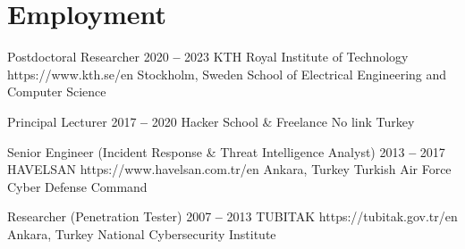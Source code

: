 

\section{Employment}

  
    \itemizeCVBegin[nolabel]{}
    
        \bTitleYearOrgLinkPlace
            {Postdoctoral Researcher}
            {2020 \textbf{--} 2023}
            {KTH Royal Institute of Technology}
            {https://www.kth.se/en}
            {Stockholm, Sweden}
            \small School of Electrical Engineering and Computer Science
            
        \bTitleYearOrgLinkPlace
            {Principal Lecturer}
            {2017 \textbf{--} 2020}
            {Hacker School \& Freelance}
            {No link}
            {Turkey}
            \small

        \bTitleYearOrgLinkPlace
            {Senior Engineer (Incident Response \& Threat Intelligence Analyst)}
            {2013 \textbf{--} 2017}
            {HAVELSAN}
            {https://www.havelsan.com.tr/en}
            {Ankara, Turkey}
            \small Turkish Air Force Cyber Defense Command

        \bTitleYearOrgLinkPlace
            {Researcher (Penetration Tester)}
            {2007 \textbf{--} 2013}
            {TUBITAK}
            {https://tubitak.gov.tr/en}
            {Ankara, Turkey}
            \small National Cybersecurity Institute

    \itemizeCVEnd
